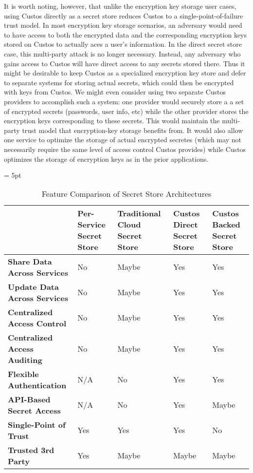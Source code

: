 It is worth noting, however, that unlike the encryption key storage
user cases, using Custos directly as a secret store reduces Custos to
a single-point-of-failure trust model. In most encryption key storage
scenarios, an adversary would need to have access to both the
encrypted data and the corresponding encryption keys stored on Custos
to actually aces a user's information. In the direct secret store
case, this multi-party attack is no longer necessary. Instead, any
adversary who gains access to Custos will have direct access to any
secrets stored there. Thus it might be desirable to keep Custos as a
specialized encryption key store and defer to separate systems for
storing actual secrets, which could then be encrypted with keys from
Custos. We might even consider using two separate Custos providers to
accomplish such a system: one provider would securely store a a set of
encrypted secrets (passwords, user info, etc) while the other provider
stores the encryption keys corresponding to these secrets. This would
maintain the multi-party trust model that encryption-key storage
benefits from. It would also allow one service to optimize the storage
of actual encrypted secretes (which may not necessarily require the
same level of access control Custos provides) while Custos optimizes
the storage of encryption keys as in the prior applications.

\begin{table}[!tb]
  \vspace{5ex}
  \begin{center}
    \tabulinesep = 5pt
    \begin{tabu} to \textwidth
      { | X[1.5,c,m]
        | X[1,c,m]
        | X[1,c,m]
        | X[1,c,m]
        | X[1,c,m]
        | }
      \hline
      & \textbf{Per-Service Secret Store}
      & \textbf{Traditional Cloud Secret Store}
      & \textbf{Custos Direct Secret Store}
      & \textbf{Custos Backed Secret Store}
      \\ \hline
      \textbf{Share Data Across Services}
      & No & Maybe & Yes & Yes
      \\ \hline
      \textbf{Update Data Across Services}
      & No & Maybe & Yes & Yes
      \\ \hline
      \textbf{Centralized Access Control}
      & No & Maybe & Yes & Yes
      \\ \hline
      \textbf{Centralized Access Auditing}
      & No & Maybe & Yes & Yes
      \\ \hline
      \textbf{Flexible Authentication}
      & N/A & No & Yes & Yes
      \\ \hline
      \textbf{API-Based Secret Access}
      & N/A & No & Yes & Maybe
      \\ \hline
      \textbf{Single-Point of Trust}
      & Yes & Yes & Yes & No
      \\ \hline
      \textbf{Trusted 3rd Party}
      & Yes & Maybe & Maybe & Maybe
      \\ \hline
      \end{tabu}
  \end{center}
  \caption{Feature Comparison of Secret Store Architectures}
  \label{tab:comp-ss}
\end{table}

